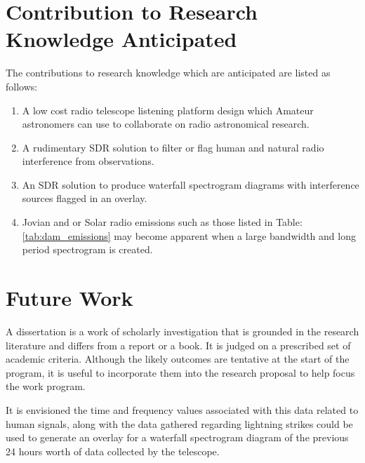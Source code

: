 \documentclass[runningheads,a4paper]{llncs}
\begin{document}
\section*{Contribution to Research Knowledge Anticipated}

The contributions to research knowledge which are anticipated are listed as follows:

\begin{enumerate}
  \item A low cost radio telescope listening platform design which Amateur astronomers can use to collaborate on radio astronomical research.
  \item A rudimentary \gls{SDR} solution to filter or flag human and natural radio interference from observations.
  \item An \gls{SDR} solution to produce waterfall spectrogram diagrams with interference sources flagged in an overlay.
  \item Jovian and or Solar radio emissions such as those listed in Table: \ref{tab:dam_emissions} may become apparent when a large bandwidth and long period spectrogram is created.
\end{enumerate} 



%
%
\newpage
\section*{Future Work}
A dissertation is a work of scholarly investigation that is grounded in the research literature and differs from a report or a book. It is judged on a prescribed set of academic criteria. Although the likely outcomes are tentative at the start of the program, it is useful to incorporate them into the research proposal to help focus the work program.


It is envisioned the time and frequency values associated with this data related to human signals, along with the data gathered regarding lightning strikes could be used to generate an overlay for a waterfall spectrogram diagram of the previous 24 hours worth of data collected by the telescope.
\end{document}
